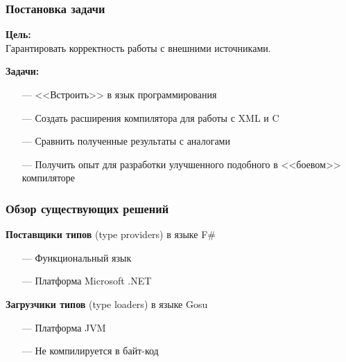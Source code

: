 \documentclass[12pt]{beamer}
\newcommand{\nl}{\vspace{\baselineskip}}
\begin{document}
\begin{frame}\frametitle{Постановка задачи}
\begin{large}
    \linespread{1}
    \textbf{Цель:}\\
    Гарантировать корректность работы с внешними источниками.

    \textbf{Задачи:}
    \begin{itemize}
        \item[---] {<<Встроить>>} в язык программирования
        \item[---] Создать расширения компилятора для работы с XML и C
        \item[---] Сравнить полученные результаты с аналогами
        \item[---] Получить опыт для разработки улучшенного подобного в {<<боевом>>} компиляторе
    \end{itemize}


    \linespread{1}
\end{large}
\end{frame}

\begin{frame}\frametitle{Обзор существующих решений} %
\begin{large}
    \textbf{Поставщики типов} (type providers) в языке F\#
    \begin{itemize}
        \item[---] Функциональный язык
        \item[---] Платформа Microsoft .NET
    \end{itemize}
    \nl
    \textbf{Загрузчики типов} (type loaders) в языке Gosu
    \begin{itemize}
        \item[---] Платформа JVM
        \item[---] Не компилируется в байт-код
    \end{itemize}
\end{large}
\end{frame}
\end{document}
